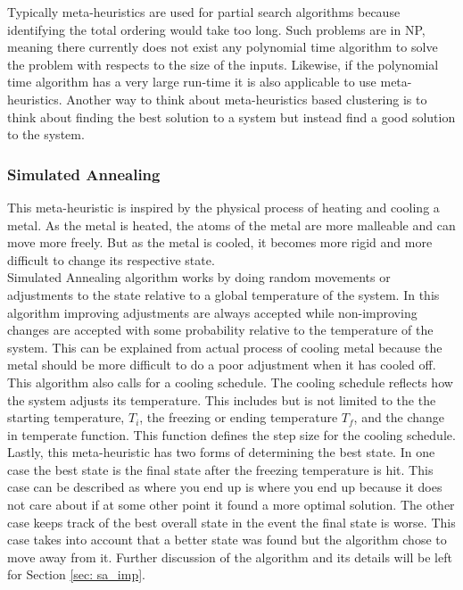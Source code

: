 \documentclass[a4paper,12pt]{article}
\numberwithin{equation}{section}
\begin{document}
Typically meta-heuristics are used for partial search algorithms because identifying the total ordering would take too long. Such problems are in NP, meaning there currently does not exist any polynomial time algorithm to solve the problem with respects to the size of the inputs. Likewise, if the polynomial time algorithm has a very large run-time it is also applicable to use meta-heuristics. Another way to think about meta-heuristics based clustering is to think about finding the best solution to a system but instead find a good solution to the system.  

\subsubsection{Simulated Annealing}
This meta-heuristic is inspired by the physical process of heating and cooling a metal. As the metal is heated, the atoms of the metal are more malleable and can move more freely. But as the metal is cooled, it becomes more rigid and more difficult to change its respective state. \\

Simulated Annealing algorithm works by doing random movements or adjustments to the state relative to a global temperature of the system. In this algorithm improving adjustments are always accepted while non-improving changes are accepted with some probability relative to the temperature of the system. This can be explained from actual process of cooling metal because the metal should be more difficult to do a poor adjustment when it has cooled off. \\

This algorithm also calls for a cooling schedule. The cooling schedule reflects how the system adjusts its temperature. This includes but is not limited to the the starting temperature, $T_i$, the freezing or ending temperature $T_f$, and the change in temperate function. This function defines the step size for the cooling schedule. \\

Lastly, this meta-heuristic has two forms of determining the best state. In one case the best state is the final state after the freezing temperature is hit. This case can be described as where you end up is where you end up because it does not care about if at some other point it found a more optimal solution. The other case keeps track of the best overall state in the event the final state is worse. This case takes into account that a better state was found but the algorithm chose to move away from it. Further discussion of the algorithm and its details will be left for Section \ref{sec: sa_imp}.
\end{document}
